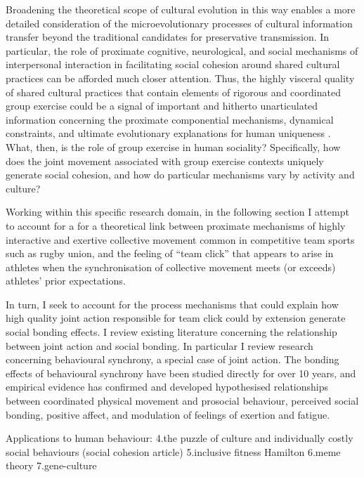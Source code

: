 Broadening the theoretical scope of cultural evolution in this way enables a more detailed consideration of the microevolutionary processes of cultural information transfer beyond the traditional candidates for preservative transmission. In particular, the role of proximate cognitive, neurological, and social mechanisms of interpersonal interaction in facilitating social cohesion around shared cultural practices can be afforded much closer attention.  Thus, the highly visceral quality of shared cultural practices that contain elements of rigorous and coordinated group exercise could be a signal of important and hitherto unarticulated information concerning the proximate componential mechanisms, dynamical constraints, and ultimate evolutionary explanations for human uniqueness \citep[3]{Claidiere2014}.  What, then, is the role of group exercise in human sociality? Specifically, how does the joint movement associated with group exercise contexts uniquely generate social cohesion, and how do particular mechanisms vary by activity and culture?

Working within this specific research domain, in the following section I attempt to account for a for a theoretical link between proximate mechanisms of highly interactive and exertive collective movement common in competitive team sports such as rugby union, and the feeling of ``team click'' that appears to arise in athletes when the synchronisation of collective movement meets (or exceeds) athletes' prior expectations.

In turn, I seek to account for the process mechanisms that could explain how high quality joint action responsible for team click could by extension generate social bonding effects.  I review existing literature concerning the relationship between joint action and social bonding. In particular I review research concerning behavioural synchrony, a special case of joint action. The bonding effects of behavioural synchrony have been studied directly for over 10 years, and empirical evidence has confirmed and developed hypothesised relationships between coordinated physical movement and prosocial behaviour, perceived social bonding, positive affect, and modulation of feelings of exertion and fatigue.




Applications to human behaviour:
    4.the puzzle of culture and individually costly social behaviours (social cohesion article)
    5.inclusive fitness Hamilton
    6.meme theory
    7.gene-culture




